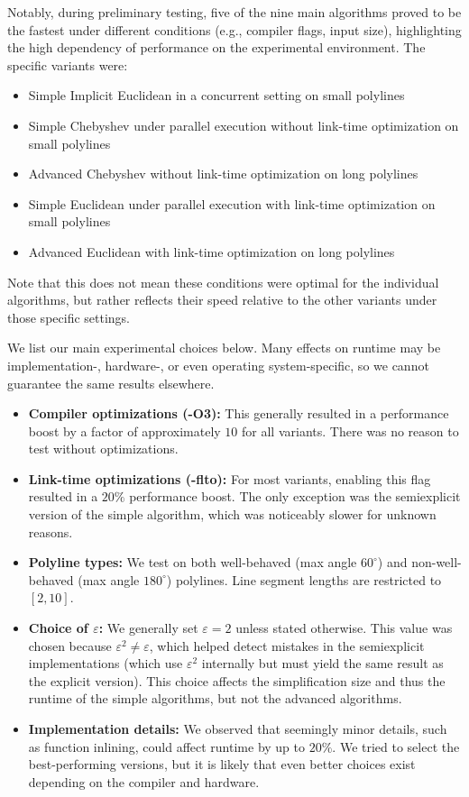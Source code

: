 Notably, during preliminary testing, five of the nine main algorithms proved to be the fastest under different conditions (e.g., compiler flags, input size), highlighting the high dependency of performance on the experimental environment. The specific variants were:
\begin{itemize}
	\item Simple Implicit Euclidean in a concurrent setting on small polylines
	\item Simple Chebyshev under parallel execution without link-time optimization on small polylines
	\item Advanced Chebyshev without link-time optimization on long polylines
	\item Simple Euclidean under parallel execution with link-time optimization on small polylines
	\item Advanced Euclidean with link-time optimization on long polylines
\end{itemize}
Note that this does not mean these conditions were optimal for the individual algorithms, but rather reflects their speed relative to the other variants under those specific settings.

We list our main experimental choices below. Many effects on runtime may be implementation-, hardware-, or even operating system-specific, so we cannot guarantee the same results elsewhere.

\begin{itemize}
	\item \textbf{Compiler optimizations (-O3):} This generally resulted in a performance boost by a factor of approximately \(10\) for all variants. There was no reason to test without optimizations.
	\item \textbf{Link-time optimizations (-flto):} For most variants, enabling this flag resulted in a \(20\%\) performance boost. The only exception was the semiexplicit version of the simple algorithm, which was noticeably slower for unknown reasons.
	\item \textbf{Polyline types:} We test on both well-behaved (max angle \(60^\circ\)) and non-well-behaved (max angle \(180^\circ\)) polylines. Line segment lengths are restricted to \([2, 10]\).
	\item \textbf{Choice of \(\varepsilon\):} We generally set \(\varepsilon = 2\) unless stated otherwise. This value was chosen because \(\varepsilon^2 \neq \varepsilon\), which helped detect mistakes in the semiexplicit implementations (which use \(\varepsilon^2\) internally but must yield the same result as the explicit version). This choice affects the simplification size and thus the runtime of the simple algorithms, but not the advanced algorithms.
	\item \textbf{Implementation details:} We observed that seemingly minor details, such as function inlining, could affect runtime by up to \(20\%\). We tried to select the best-performing versions, but it is likely that even better choices exist depending on the compiler and hardware.
\end{itemize}

